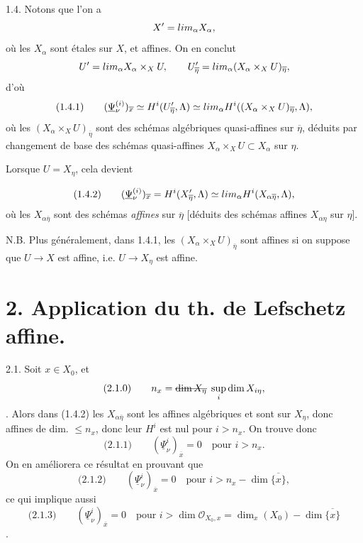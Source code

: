 \documentclass[11pt,a4paper]{article}
\begin{document}

1.4. Notons que l'on a
\[
X' = \varprojlim_\alpha X_\alpha ,
\]
où les $X_\alpha$ sont étales sur $X$, et affines. On en conclut
\[
U' = \varprojlim_\alpha X_\alpha \times_X U , \qquad U'_{\overline{\eta}} = \varprojlim_\alpha (X_\alpha \times_X U)_{\overline{\eta}} ,
\]
d'où
\[
\text{(1.4.1)} \qquad (\underline{\Psi}^{(i)}_\nu)_{\overline{x}} \simeq H^i(U'_{\overline{\eta}}, \Lambda) \simeq \varinjlim_\alpha H^i((X_\alpha \times_X U)_{\overline{\eta}}, \Lambda) ,
\]
où les \struck{\ill{}} $(X_\alpha \times_X U)_{\overline{\eta}}$ sont des schémas algébriques quasi-affines sur $\overline{\eta}$, déduits par changement de base des schémas quasi-affines $X_\alpha \times_X U \subset X_\alpha$ sur $\eta$.

Lorsque $U = X_\eta$, cela devient

\[
\text{(1.4.2)} \qquad (\underline{\Psi}^{(i)}_\nu)_{\overline{x}} = H^i(X'_{\overline{\eta}}, \Lambda) \simeq \varinjlim_\alpha H^i(X_{\alpha\overline{\eta}}, \Lambda) ,
\]
où les $X_{\alpha\overline{\eta}}$ sont des schémas  \emph{affines} sur $\overline{\eta}$ [déduits des schémas affines $X_{\alpha\eta}$ sur $\eta$]. \struck{\ill{}}

N.B. Plus généralement, dans 1.4.1, les $(X_\alpha \times_X U)_{\overline{\eta}}$ sont affines si on suppose que $U \to X$ est affine, i.e. $U \to X_\eta$ est affine.


\section*{2. Application du th. de Lefschetz affine.}

2.1. Soit $x \in X_0$, et
\[
\text{(2.1.0)} \qquad n_x = \text{\struck{$\dim X_\eta$}} \; \sup_i \dim X_{i\eta} ,
\]
.  Alors dans (1.4.2) les $X_{\alpha\overline{\eta}}$ sont les affines algébriques   et sont   sur $X_\eta$, donc affines de dim. $\leqslant n_x$, donc  leur $H^i$ est nul pour $i > n_x$. On trouve donc
\[
\text{(2.1.1)} \qquad (\underline{\Psi}^i_\nu)_{\overline{x}} = 0 \quad \text{pour } i > n_x .
\]
On en améliorera ce résultat en prouvant que
\[
\text{(2.1.2)} \qquad (\underline{\Psi}^i_\nu)_{\overline{x}} = 0 \quad \text{pour } i > n_x - \dim \overline{\{x\}} ,
\]
ce qui implique aussi
\[
\text{(2.1.3)} \qquad (\underline{\Psi}^i_\nu)_{\overline{x}} = 0 \quad \text{pour } i > \dim \mathcal{O}_{X_0, x} = \dim_x(X_0) - \dim \overline{\{x\}}
\]
.
\end{document}
